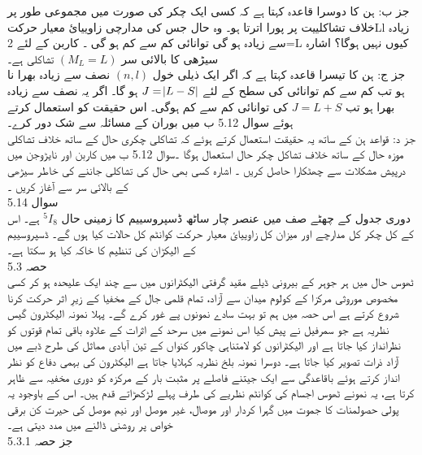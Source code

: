     جز ب: ہن کا دوسرا قاعدہ کہتا ہے کہ کسی ایک چکر کی صورت میں مجموعی طور پر خلاف تشاکلییت پر پورا اترتا ہو۔ وہ حال جس کی مدارچی زاوییائ معیار حرکتLl زیادہ سے زیادہ ہو گی توانائی کم سے کم ہو گی ۔ کاربن کے لئے 2=L کیوں نہیں ہوگا؟ اشارہ سیڑھی کا بالائی سر
    \((M_{L}=L)\)
      تشاکلی ہے۔\\
      جز ج: ہن کا تیسرا قاعدہ کہتا ہے کہ اگر ایک ذیلی خول 
   \((n,l)\)
       نصف سے زیادہ بھرا نا ہو تب کم سے کم توانائی کی سطح کے لئے 
    \(J=\abs{L-S}\)
        ہو گا۔ اگر یہ نصف سے زیادہ بھرا ہو تب
\( J=L+S\)
 کی توانائی کم سے کم ہوگی۔ اس حقیقت کو استعمال کرتے ہوئے سوال 5.12 ب میں بوران کے مسائلہ سے شک دور کرے۔\\ 
جز د: قواعد ہن کے ساتھ یہ حقیقت استعمال کرتے ہوئے کہ تشاکلی چکری حال کے ساتھ خلاف تشاکلی موزہ حال کے ساتھ خلاف تشاکل چکر حال استعمال ہوگا ۔سوال 5.12 ب میں کاربن اور نایڑوجن میں درپیش مشکلات سے چھٹکارا حاصل کریں ۔ اشارہ کسی بھی حال کی تشاکلی جاننے کی خاطر سیڑھی کے بالائی سر سے آغاز کریں ۔\\
 سوال 5.14\\
  دوری جدول کے چھٹے صف میں عنصر چار ساٹھ ڈسپروسییم کا زمینی حال
  \(^{5}I_{8}\) 
  ہے۔ اس کے کل چکر کل مدارچے اور میزان کل زاوییائ معیار حرکت کوانٹم کل حالات کیا ہوں گے۔ ڈسپروسییم کے الیکڑان  کی تنظیم کا خاکہ کیا ہو سکتا ہے۔\\
حصہ
 5.3\\
 
ٹھوس حال میں ہر جوہر کے بیرونی ڈیلے مقید گرفتی الیکٹرانوں میں سے چند ایک علیحدہ ہو کر کسی مخصوص موروثی مرکزا کے کولوم میدان سے آزاد، تمام قلمی جال کے مخفیا کے زیرِ اثر حرکت کرنا شروع کرتے ہے اس حصہ میں ہم تو بہت سادے نمونوں پے غور کرے گے۔ پہلا نمونہ الیکٹرون گیس نظریہ ہے جو سمرفيل نے پیش کیا اس نمونے میں سرحد کے اثرات کے علاوہ باقی تمام قوتوں کو نظرانداز کیا جاتا ہے اور الیکٹرانوں کو لامتناہی چاکور کنواں کے تین آبادی مماثل کی طرح ڈبے میں آزاد ذرات تصویر کیا جاتا ہے۔ دوسرا نمونہ بلخ نظریہ کہلایا جاتا ہے الیکٹرون کی بہمی دفاع کو نظر انداز کرتے ہوئے باقاعدگی سے ایک جیتنے فاصلے پر مثبت بار کے مرکزہ کو دوری مخفیہ سے ظاہر کرتا ہے، یہ نمونے ٹھوس اجسام کی کوانٹم نظریے کی طرف پہلے لڑکھڑاتے قدم ہیں۔ اس کے باوجود یہ پولی حصولمنات کا جموت میں گہرا کردار اور موصال، غیر موصل اور نیم موصل کی حیرت کن برقی خواص پر روشنی ڈالنے میں مدد دیتی ہے۔\\
جز حصہ
 5.3.1\\
 
